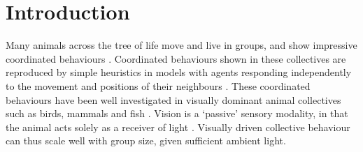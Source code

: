 \documentclass[
]{book}
\begin{document}
\newpage

\hypertarget{introduction-2}{%
\section{Introduction}\label{introduction-2}}

Many animals across the tree of life move and live in groups, and show impressive coordinated behaviours \citep{sumpter2006principles}. Coordinated behaviours shown in these collectives are reproduced by simple heuristics in models with agents responding independently to the movement and positions of their neighbours \citep{couzin2002a}. These coordinated behaviours have been well investigated in visually dominant animal collectives such as birds, mammals and fish \citep{ballerini2008a, strandburg2013visual, pita2016collective}. Vision is a `passive' sensory modality, in that the animal acts solely as a receiver of light \citep{nelson2006a}. Visually driven collective behaviour can thus scale well with group size, given sufficient ambient light.
\end{document}
